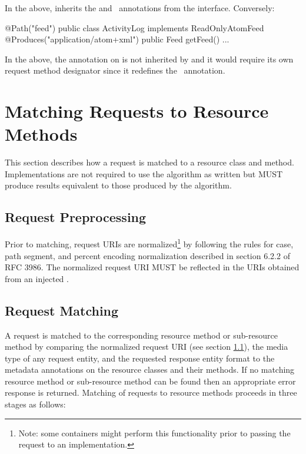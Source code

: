 In the above,  inherits the  and \Produces\ annotations from the interface. Conversely:

\begin{listing}{1}
@Path("feed")
public class ActivityLog implements ReadOnlyAtomFeed {
  @Produces("application/atom+xml")
  public Feed getFeed() {...}
}
\end{listing}

In the above, the  annotation on  is not inherited by  and it would require its own request method designator since it redefines the \Produces\ annotation.

\section{Matching Requests to Resource Methods}
\label{mapping_requests_to_java_methods}

This section describes how a request is matched to a resource class and method. Implementations are not required to use the algorithm as written but MUST produce results equivalent to those produced by the algorithm.

\subsection{Request Preprocessing}
\label{reqpreproc}

Prior to matching, request URIs are normalized\footnote{Note: some containers might perform this functionality prior to passing the request to an implementation.} by following the rules for case, path segment, and percent encoding normalization described in section 6.2.2 of RFC 3986\cite{uri}. The normalized request URI MUST be reflected in the URIs obtained from an injected .

\subsection{Request Matching}
\label{request_matching}

A request is matched to the corresponding resource method or sub-resource method by comparing the normalized request URI (see section \ref{reqpreproc}), the media type of any request entity, and the requested response entity format to the metadata annotations on the resource classes and their methods. If no matching resource method or sub-resource method can be found then an appropriate error response is returned. Matching of requests to resource methods proceeds in three stages as follows:

